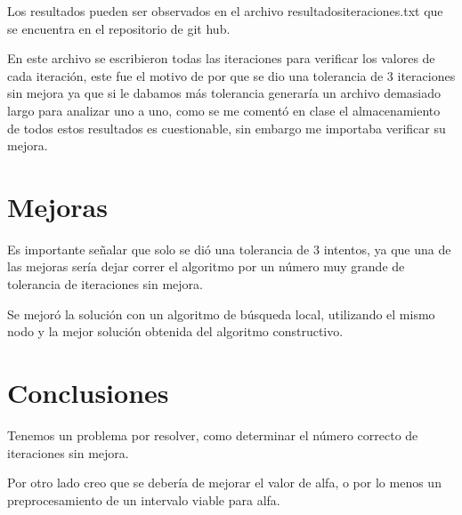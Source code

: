 \documentclass[12pt,a4paper]{article}
\begin{document}
Los resultados pueden ser observados en el archivo resultadositeraciones.txt que se encuentra en el repositorio de git hub.

En este archivo se escribieron todas las iteraciones para verificar los valores de cada iteración, este fue el motivo de por que se dio una tolerancia de 3 iteraciones sin mejora ya que si le dabamos más tolerancia generaría un archivo demasiado largo para analizar uno a uno, como se me comentó en clase el almacenamiento de todos estos resultados es cuestionable, sin embargo me importaba verificar su mejora.

\section{Mejoras}

Es importante señalar que solo se dió una tolerancia de 3 intentos, ya que una de las mejoras sería dejar correr el algoritmo por un número muy grande de tolerancia de iteraciones sin mejora.

 Se mejoró la solución con un algoritmo de búsqueda local, utilizando el mismo nodo y la mejor solución obtenida del algoritmo constructivo.
\section{Conclusiones} 
Tenemos un problema por resolver, como determinar el número correcto de iteraciones sin mejora.

Por otro lado creo que se debería de mejorar el valor de alfa, o por lo menos un preprocesamiento de un intervalo viable para alfa.
\newpage

\end{document}
